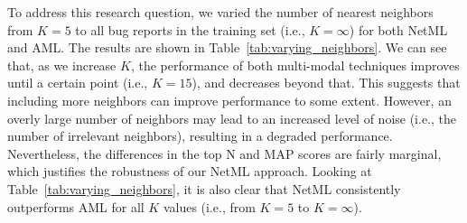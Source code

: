 

%
%


To address this research question, we varied the number of nearest neighbors from $K=5$ to all bug reports in the training set (i.e., $K=\infty$) for both NetML and AML. The results are shown in Table~\ref{tab:varying_neighbors}. We can see that, as we increase $K$, the performance of both multi-modal techniques improves until a certain point (i.e., $K=15$), and decreases beyond that. This suggests that including more neighbors can improve performance to some extent. However, an overly large number of neighbors may lead to an increased level of noise (i.e., the number of irrelevant neighbors), resulting in a degraded performance. Nevertheless, the differences in the top N and MAP scores are fairly marginal, which justifies the robustness of our NetML approach. Looking at Table~\ref{tab:varying_neighbors}, it is also clear that NetML consistently outperforms AML for all $K$ values (i.e., from $K=5$ to $K=\infty$).

